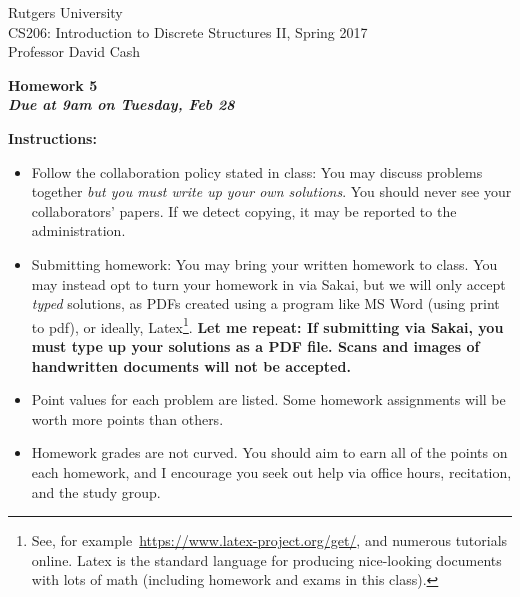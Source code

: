 \documentclass[11pt]{article}
\begin{document}
\sloppy

\noindent Rutgers University\\
CS206: Introduction to Discrete Structures II, Spring 2017\\
Professor David Cash\\

\begin{center}
\LARGE{\textbf{Homework 5}}\\
\large{\textbf{\emph{Due at 9am on Tuesday, Feb 28}}}
\end{center}

\vspace{.1in}

\noindent\textbf{Instructions:} \begin{itemize}

\item Follow the collaboration policy stated in class:  You may discuss
problems together \emph{but you must write up your own solutions}.  You should
never see your collaborators' papers.  If we detect copying, it may be reported
to the administration.

\item Submitting homework:  You may bring your written homework to class.  You
may instead opt to turn your homework in via Sakai, but we will only accept
\emph{typed} solutions, as PDFs created using a program like MS Word (using
print to pdf), or ideally, Latex\footnote{See, for
example~\url{https://www.latex-project.org/get/}, and numerous tutorials
online.  Latex is the standard language for producing nice-looking documents
with lots of math (including homework and exams in this class).}.  \textbf{Let
me repeat: If submitting via Sakai, you must type up your solutions as a PDF
file.  Scans and images of handwritten documents will not be accepted.}

\item Point values for each problem are listed.  Some homework assignments will
be worth more points than others.  

\item Homework grades are not curved.  You should aim to earn all of the points
on each homework, and I encourage you seek out help via office hours,
recitation, and the study group.

\end{itemize}
\end{document}
